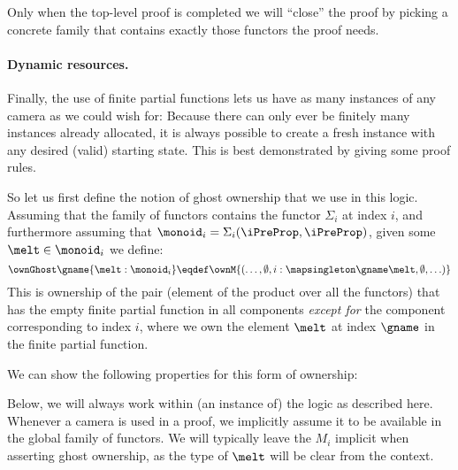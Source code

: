 Only when the top-level proof is completed we will ``close'' the proof by picking a concrete family that contains exactly those functors the proof needs.

\paragraph{Dynamic resources.}
Finally, the use of finite partial functions lets us have as many instances of any camera as we could wish for:
Because there can only ever be finitely many instances already allocated, it is always possible to create a fresh instance with any desired (valid) starting state.
This is best demonstrated by giving some proof rules.

So let us first define the notion of ghost ownership that we use in this logic.
Assuming that the family of functors contains the functor $\Sigma_i$ at index $i$, and furthermore assuming that $\monoid_i = \Sigma_i(\iPreProp, \iPreProp)$, given some $\melt \in \monoid_i$ we define:
\[ \ownGhost\gname{\melt:\monoid_i} \eqdef \ownM{(\ldots, \emptyset, i:\mapsingleton \gname \melt, \emptyset, \ldots)} \]
This is ownership of the pair (element of the product over all the functors) that has the empty finite partial function in all components \emph{except for} the component corresponding to index $i$, where we own the element $\melt$ at index $\gname$ in the finite partial function.

We can show the following properties for this form of ownership:

Below, we will always work within (an instance of) the logic as described here.
Whenever a camera is used in a proof, we implicitly assume it to be available in the global family of functors.
We will typically leave the $M_i$ implicit when asserting ghost ownership, as the type of $\melt$ will be clear from the context.





